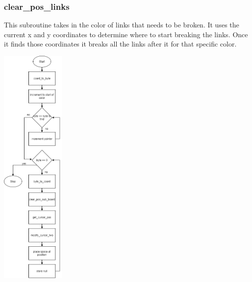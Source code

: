 \documentclass{article}
\begin{document}
    
    \subsubsection{clear\_pos\_links}
        This subroutine takes in the color of links that needs to be broken.
        It uses the current x and y coordinates to determine where to start 
        breaking the links.  Once it finds those coordinates it breaks all
        the links after it for that specific color.
        \begin{center}
            {\includegraphics[height=12cm]{clear_pos_links.png}\centering} 
        \end{center}
        \newpage
\end{document}

